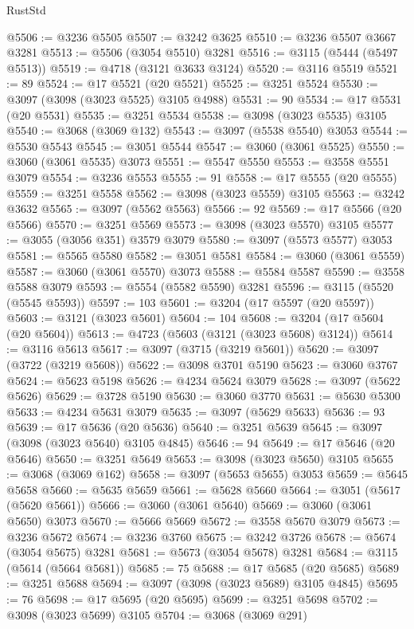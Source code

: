\begin{lexlean}{RustStd}
\begin{coremodule}
{\begin{coremodule}
{{{{{{{{{{{{{{{{{{{{{{{{{{{{{{{{@5506 := @3236 @5505
@5507 := @3242 @3625
@5510 := @3236 @5507 @3667 @3281
@5513 := @5506 (@3054 @5510) @3281
@5516 := @3115 (@5444 (@5497 @5513))
@5519 := @4718 (@3121 @3633 @3124)
@5520 := @3116 @5519
@5521 := 89
@5524 := @17 @5521 (@20 @5521)
@5525 := @3251 @5524
@5530 := @3097 (@3098 (@3023 @5525) @3105 @4988)
@5531 := 90
@5534 := @17 @5531 (@20 @5531)
@5535 := @3251 @5534
@5538 := @3098 (@3023 @5535) @3105
@5540 := @3068 (@3069 @132)
@5543 := @3097 (@5538 @5540) @3053
@5544 := @5530 @5543
@5545 := @3051 @5544
@5547 := @3060 (@3061 @5525)
@5550 := @3060 (@3061 @5535) @3073
@5551 := @5547 @5550
@5553 := @3558 @5551 @3079
@5554 := @3236 @5553
@5555 := 91
@5558 := @17 @5555 (@20 @5555)
@5559 := @3251 @5558
@5562 := @3098 (@3023 @5559) @3105
@5563 := @3242 @3632
@5565 := @3097 (@5562 @5563)
@5566 := 92
@5569 := @17 @5566 (@20 @5566)
@5570 := @3251 @5569
@5573 := @3098 (@3023 @5570) @3105
@5577 := @3055 (@3056 @351) @3579 @3079
@5580 := @3097 (@5573 @5577) @3053
@5581 := @5565 @5580
@5582 := @3051 @5581
@5584 := @3060 (@3061 @5559)
@5587 := @3060 (@3061 @5570) @3073
@5588 := @5584 @5587
@5590 := @3558 @5588 @3079
@5593 := @5554 (@5582 @5590) @3281
@5596 := @3115 (@5520 (@5545 @5593))
@5597 := 103
@5601 := @3204 (@17 @5597 (@20 @5597))
@5603 := @3121 (@3023 @5601)
@5604 := 104
@5608 := @3204 (@17 @5604 (@20 @5604))
@5613 := @4723 (@5603 (@3121 (@3023 @5608) @3124))
@5614 := @3116 @5613
@5617 := @3097 (@3715 (@3219 @5601))
@5620 := @3097 (@3722 (@3219 @5608))
@5622 := @3098 @3701 @5190
@5623 := @3060 @3767
@5624 := @5623 @5198
@5626 := @4234 @5624 @3079
@5628 := @3097 (@5622 @5626)
@5629 := @3728 @5190
@5630 := @3060 @3770
@5631 := @5630 @5300
@5633 := @4234 @5631 @3079
@5635 := @3097 (@5629 @5633)
@5636 := 93
@5639 := @17 @5636 (@20 @5636)
@5640 := @3251 @5639
@5645 := @3097 (@3098 (@3023 @5640) @3105 @4845)
@5646 := 94
@5649 := @17 @5646 (@20 @5646)
@5650 := @3251 @5649
@5653 := @3098 (@3023 @5650) @3105
@5655 := @3068 (@3069 @162)
@5658 := @3097 (@5653 @5655) @3053
@5659 := @5645 @5658
@5660 := @5635 @5659
@5661 := @5628 @5660
@5664 := @3051 (@5617 (@5620 @5661))
@5666 := @3060 (@3061 @5640)
@5669 := @3060 (@3061 @5650) @3073
@5670 := @5666 @5669
@5672 := @3558 @5670 @3079
@5673 := @3236 @5672
@5674 := @3236 @3760
@5675 := @3242 @3726
@5678 := @5674 (@3054 @5675) @3281
@5681 := @5673 (@3054 @5678) @3281
@5684 := @3115 (@5614 (@5664 @5681))
@5685 := 75
@5688 := @17 @5685 (@20 @5685)
@5689 := @3251 @5688
@5694 := @3097 (@3098 (@3023 @5689) @3105 @4845)
@5695 := 76
@5698 := @17 @5695 (@20 @5695)
@5699 := @3251 @5698
@5702 := @3098 (@3023 @5699) @3105
@5704 := @3068 (@3069 @291)
}}}}}}}}}}}}}}}}}}}}}}}}}}}}}}}}
\end{coremodule}}
\end{coremodule}
\end{lexlean}
